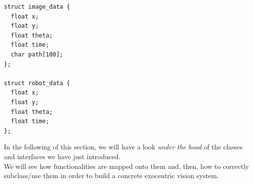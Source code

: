 \begin{lstlisting}[caption={\framework{} data structures}, label={code:data}, frame=trBL]
struct image_data {
  float x;
  float y;
  float theta;
  float time;
  char path[100];
};

struct robot_data {
  float x;
  float y;
  float theta;
  float time;
};
\end{lstlisting}

In the following of this section, we will have a look 
\textit{under the hood} of the classes and interfaces 
we have just introduced.
\\
We will see how \framework{} functionalities are 
mapped onto them and, then, how to correctly subclass/use
them in order to build a concrete exocentric vision system.
